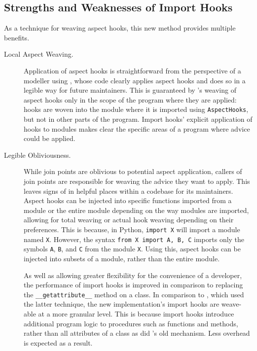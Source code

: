 \subsection{Strengths and Weaknesses of Import Hooks}\label{subsec:pdsf3importhooklimitations}

As a technique for weaving aspect hooks, this new method provides multiple
benefits.


\begin{description}
    \item[Local Aspect Weaving.] Application of aspect hooks is straightforward
        from the perspective of a modeller using \pdsfthree{}, whose code clearly
        applies aspect hooks and does so in a legible way for future
        maintainers. This is guaranteed by \pdsfthree{}'s weaving of aspect hooks
        only in the scope of the program where they are applied: hooks are woven
        into the module where it is imported using \lstinline{AspectHooks}, but
        not in other parts of the program. Import hooks' explicit application of
        hooks to modules makes clear the specific areas of a program where
        advice could be applied.

    \item[Legible Obliviousness.] While join points are oblivious to potential
        aspect application, callers of join points are responsible for weaving
        the advice they want to apply. This leaves signs of \aspectorientation{}
        in helpful places within a codebase for its maintainers. Aspect hooks
        can be injected into specific functions imported from a module or the
        entire module depending on the way modules are imported, allowing for
        total weaving or actual hook weaving depending on their preferences.
        This is because, in Python, \lstinline{import X} will import a module
        named \lstinline{X}. However, the syntax \lstinline{from X import A, B, C} imports only
        the symbols \lstinline{A}, \lstinline{B}, and \lstinline{C} from the
        module \lstinline{X}. Using this, aspect hooks can be injected into
        subsets of a module, rather than the entire module.
        
        As well as allowing greater flexibility for the convenience of a
        developer, the performance of import hooks is improved in comparison to
        replacing the \lstinline{__getattribute__} method on a class. In
        comparison to \pydysofu{}, which used the
        latter technique, the new implementation's import hooks are weave-able
        at a more granular level. This is because import hooks introduce
        additional program logic to procedures such as functions and methods,
        rather than all attributes of a class as did
        \pydysofu{}'s old mechanism. Less overhead is expected as a result.


\end{description}
